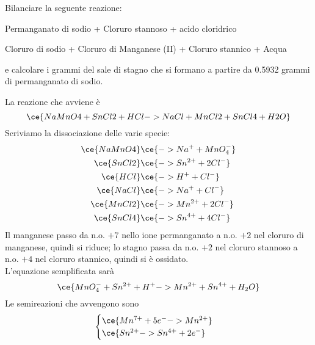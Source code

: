 \begin{esercizio}
    Bilanciare la seguente reazione:

\begin{center}
    Permanganato di sodio + Cloruro stannoso + acido cloridrico \ce{->}

    \ce{->} Cloruro di sodio + Cloruro di Manganese (II) + Cloruro stannico + Acqua
\end{center}

e calcolare i grammi del sale di stagno che si formano a partire da 0.5932 grammi di permanganato di sodio.
\end{esercizio}
\begin{soluzione}
    La reazione che avviene è
    \begin{equation*}
        \ce{NaMnO4 + SnCl2 + HCl -> NaCl + MnCl2 + SnCl4 + H2O}
    \end{equation*}
    Scriviamo la dissociazione delle varie specie:
    \begin{equation*}
        \begin{split}
            \ce{NaMnO4} & \ce{-> Na^+ + MnO_4^-}
            \\
            \ce{SnCl2} & \ce{-> Sn^{2+} + 2Cl^-}
            \\
            \ce{HCl} & \ce{-> H^+ + Cl^-}
            \\
            \ce{NaCl} & \ce{-> Na^+ + Cl^-}
            \\
            \ce{MnCl2} & \ce{-> Mn^{2+} + 2Cl^-}
            \\
            \ce{SnCl4} & \ce{-> Sn^{4+} + 4Cl^-}
        \end{split}
    \end{equation*}
    Il manganese passo da n.o. $+7$ nello ione permanganato a n.o. $+2$ nel cloruro di manganese, quindi si riduce; lo stagno passa da n.o. $+2$ nel cloruro stannoso a n.o. $+4$ nel cloruro stannico, quindi si è ossidato.\\
    L'equazione semplificata sarà
    \begin{equation*}
        \ce{MnO_4^- + Sn^{2+} + H^+ -> Mn^{2+} + Sn^{4+} + H_2O}
    \end{equation*}
    Le semireazioni che avvengono sono
    \begin{equation*}
        \begin{cases}
            \ce{Mn^{7+} + 5e^- -> Mn^{2+}}\\
            \ce{Sn^{2+} -> Sn^{4+} + 2e^-}
        \end{cases}

\end{equation*}
\end{soluzione}

